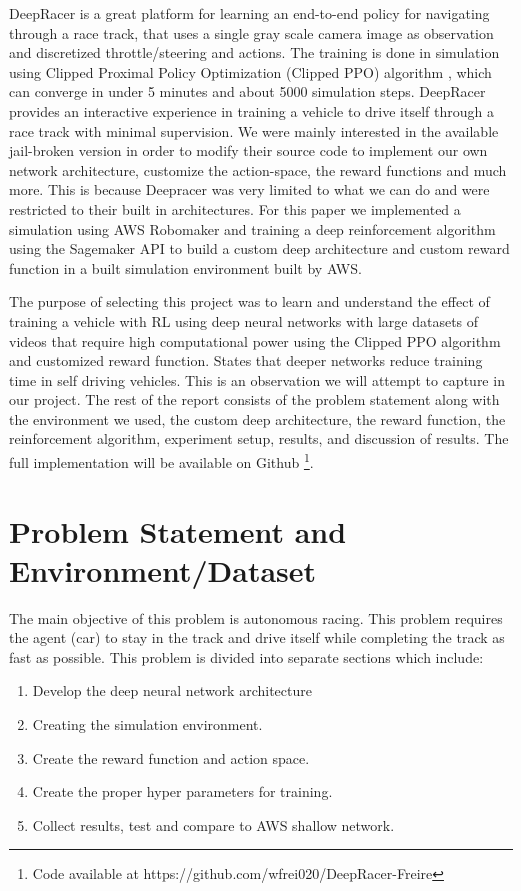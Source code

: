 \documentclass[journal]{IEEEtran}
\begin{document}
DeepRacer is a great platform for learning an end-to-end policy for navigating through a race track, that uses a single gray scale camera image as observation and discretized throttle/steering and actions. The training is done in simulation using Clipped Proximal Policy Optimization (Clipped PPO) algorithm \cite{schulman2017proximal}, which can converge in under 5 minutes and about 5000 simulation steps. DeepRacer provides an interactive experience in training a vehicle to drive itself through a race track with minimal supervision. We were mainly interested in the available jail-broken version in order to modify their source code to implement our own network architecture, customize the action-space, the reward functions and much more.  This is because Deepracer was very limited to what we can do and were restricted to their built in architectures. For this paper we implemented a simulation using AWS Robomaker and training a deep reinforcement algorithm using the Sagemaker API to build a custom deep architecture and custom reward function in a built simulation environment built by AWS.  

The purpose of selecting this project was to learn and understand the effect of training a vehicle with RL using deep neural networks with large datasets of videos that require high computational power using the Clipped PPO algorithm and customized reward function.  \cite{7830823} States that deeper networks reduce training time in self driving vehicles.  This is an observation we will attempt to capture in our project.  The rest of the report consists of the problem statement along with the environment we used, the custom deep architecture, the reward function, the reinforcement algorithm, experiment setup, results, and discussion of results.  The full implementation will be available on Github \footnote{ Code available at https://github.com/wfrei020/DeepRacer-Freire}.

\section{Problem Statement and Environment/Dataset}
The main objective of this problem is autonomous racing.  This problem requires the agent (car) to stay in the track and drive itself while completing the track as fast as possible.  This problem is divided into separate sections which include:

\begin{enumerate}
  \item Develop the deep neural network architecture
  \item Creating the simulation environment.
  \item Create the reward function and action space.
  \item Create the proper hyper parameters for training.
  \item Collect results, test and compare to AWS shallow network.
\end{enumerate}
\end{document}
